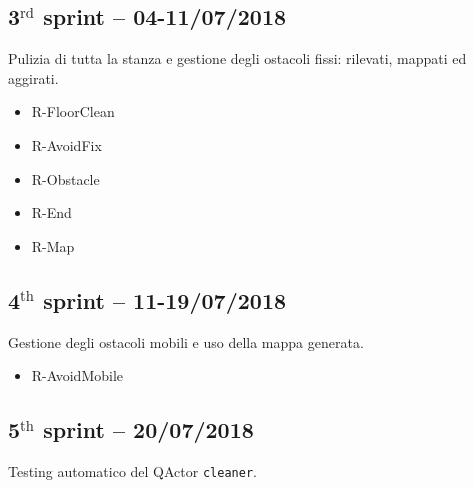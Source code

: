 \subsection{3$^{\textrm{rd}}$ sprint -- 04-11/07/2018}
Pulizia di tutta la stanza e gestione degli ostacoli fissi: rilevati, mappati ed aggirati.

\begin{itemize}
	\ttfamily
	\item R-FloorClean
	\item R-AvoidFix
	\item R-Obstacle
	\item R-End
	\item R-Map
\end{itemize}

\subsection{4$^{\textrm{th}}$ sprint -- 11-19/07/2018}
Gestione degli ostacoli mobili e uso della mappa generata.

\begin{itemize}
	\ttfamily
	\item R-AvoidMobile
\end{itemize}

\subsection{5$^{\textrm{th}}$ sprint -- 20/07/2018}
Testing automatico del QActor \texttt{cleaner}.


